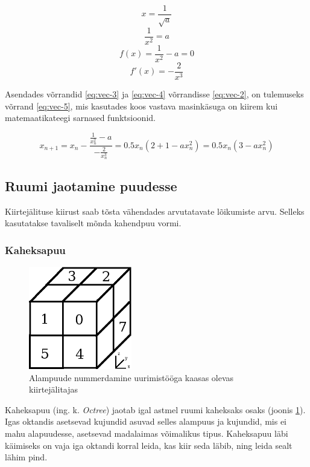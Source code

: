 \documentclass[a4paper,12pt]{report}
\begin{document}
\[x = \frac 1 {\sqrt a}\]
\[\frac 1{x^2} = a\]
\begin{equation} \label{eq:vec-3}
f(x) = \frac 1{x^2} - a = 0
\end{equation}
\begin{equation} \label{eq:vec-4}
f'(x) = -\frac 2{x^3}
\end{equation}

Asendades võrrandid \ref{eq:vec-3} ja \ref{eq:vec-4} võrrandisse \ref{eq:vec-2},
on tulemuseks võrrand \ref{eq:vec-5}, mis kasutades koos vastava masinkäsuga
on kiirem kui matemaatikateegi sarnased funktsioonid.

\begin{equation} \label{eq:vec-5}
x_{n+1} = x_n - \frac {\frac 1{x_n^2} - a}{-\frac 2{x_n^3}} = 0.5x_n(2 + 1 - ax_n^2) = 0.5x_n(3-ax_n^2)
\end{equation}

\subsection{Ruumi jaotamine puudesse}
Kiirtejälituse kiirust saab tõsta vähendades arvutatavate lõikumiste arvu.
Selleks kasutatakse tavaliselt mõnda kahendpuu vormi.

\subsubsection{Kaheksapuu}
\begin{figure}
\includegraphics[width=0.4\textwidth]{octree}
\caption{Alampuude nummerdamine uurimistööga kaasas olevas kiirtejälitajas}
\label{fig:octree}
\end{figure}
Kaheksapuu (ing. k. \textit{Octree}) jaotab igal astmel ruumi kaheksaks
osaks (joonis \ref{fig:octree}). Igas oktandis asetsevad kujundid asuvad selles alampuus ja kujundid,
mis ei mahu alapuudesse, asetsevad madalaimas võimalikus tipus. Kaheksapuu
läbi käimiseks on vaja iga oktandi korral leida, kas kiir seda läbib, ning
leida sealt lähim pind.
\end{document}
